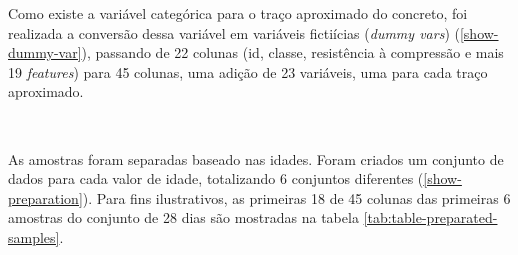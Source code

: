 \documentclass[]{article}
\begin{document}
Como existe a variável categórica para o traço aproximado do concreto,
foi realizada a conversão dessa variável em variáveis fictiícias
(\emph{dummy vars}) (\ref{show-dummy-var}), passando de 22 colunas (id,
classe, resistência à compressão e mais 19 \emph{features}) para 45
colunas, uma adição de 23 variáveis, uma para cada traço aproximado.

~

As amostras foram separadas baseado nas idades. Foram criados um
conjunto de dados para cada valor de idade, totalizando 6 conjuntos
diferentes (\ref{show-preparation}). Para fins ilustrativos, as
primeiras 18 de 45 colunas das primeiras 6 amostras do conjunto de 28
dias são mostradas na tabela \ref{tab:table-preparated-samples}.

~

\begin{table}[H]

\caption{\label{tab:table-preparated-samples}Primeiras 18 colunas das primeiras 6 amostras de 28 dias}
\centering
{}
\end{table}
\end{document}
